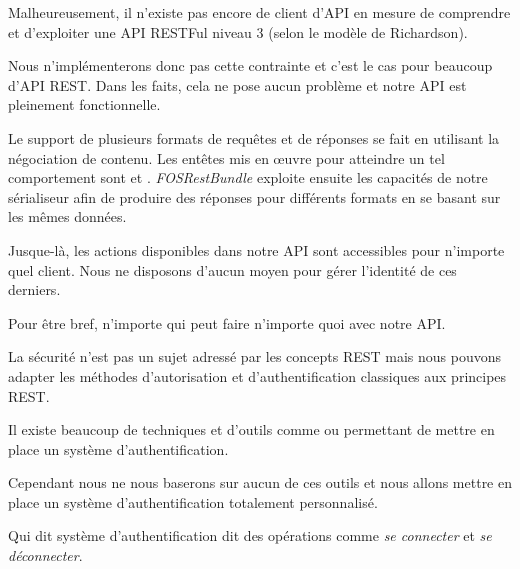 \documentclass[big]{zmdocument}
\begin{document}
Malheureusement, il n'existe pas encore de client d'API en mesure de comprendre et d'exploiter une API RESTFul niveau 3 (selon le modèle de Richardson).



Nous n'implémenterons donc pas cette contrainte et c'est le cas pour beaucoup d'API REST. Dans les faits, cela ne pose aucun problème et notre API est pleinement fonctionnelle.



\horizontalLine



Le support de plusieurs formats de requêtes et de réponses se fait en utilisant la négociation de contenu. 
Les entêtes mis en œuvre pour atteindre un tel comportement sont  et . \textit{FOSRestBundle} exploite ensuite les capacités de notre sérialiseur afin de produire des réponses pour différents formats en se basant sur les mêmes données.







Jusque-là, les actions disponibles dans notre API sont accessibles pour n'importe quel client. Nous ne disposons d'aucun moyen pour gérer l'identité de ces derniers.



Pour être bref, n'importe qui peut faire n'importe quoi avec notre API.



\begin{Information}
La sécurité n'est pas un sujet adressé par les concepts REST mais nous pouvons adapter les méthodes d'autorisation et d'authentification classiques aux principes REST.
\end{Information}


Il existe beaucoup de techniques et d'outils comme  ou  permettant de mettre en place un système d'authentification.



Cependant nous ne nous baserons sur aucun de ces outils et nous allons mettre en place un système d'authentification totalement personnalisé.





Qui dit système d'authentification dit des opérations comme \textit{se connecter} et \textit{se déconnecter}.
\end{document}
